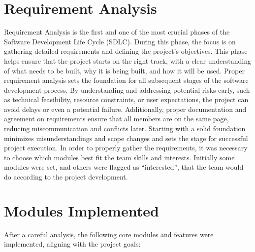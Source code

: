 \section{Requirement Analysis}

Requirement Analysis is the first and one of the most crucial phases of the Software Development Life Cycle (SDLC). During this phase, the focus is on gathering detailed requirements and defining the project’s objectives. This phase helps ensure that the project starts on the right track, with a clear understanding of what needs to be built, why it is being built, and how it will be used. Proper requirement analysis sets the foundation for all subsequent stages of the software development process.
By understanding and addressing potential risks early, such as technical feasibility, resource constraints, or user expectations, the project can avoid delays or even a potential failure. Additionally,  proper documentation and agreement on requirements ensure that all members are on the same page, reducing miscommunication and conflicts later. 
Starting with a solid foundation minimizes misunderstandings and scope changes and sets the stage for successful project execution. In order to properly gather the requirements, it was necessary to choose which modules best fit the team skills and interests. Initially some modules were set, and others were flagged as “interested”, that the team would do according to the project development. 


\section{Modules Implemented}

After a careful analysis, the following core modules and features were implemented, aligning with the project goals:

